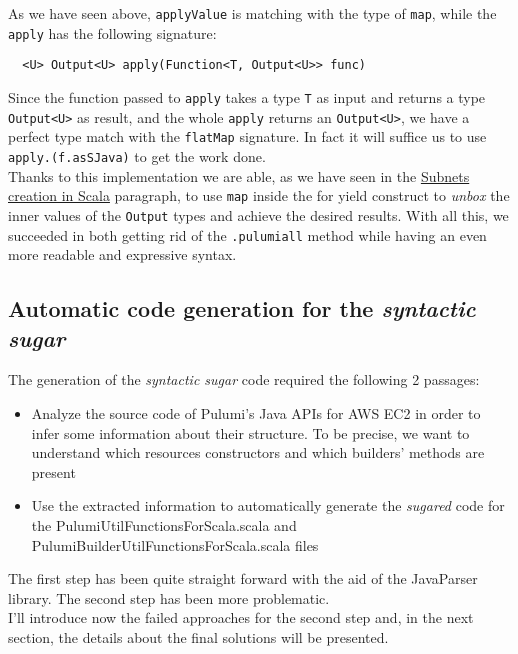 As we have seen above, \texttt{applyValue} is matching with the type of \texttt{map}, while the \texttt{apply} has the following signature:
\begin{verbatim}
  <U> Output<U> apply(Function<T, Output<U>> func)
\end{verbatim}
Since the function passed to \texttt{apply} takes a type \texttt{T} as input and returns a type \texttt{Output<U>} as result, and the whole \texttt{apply} returns an \texttt{Output<U>}, we have a perfect type match with the \texttt{flatMap} signature.
In fact it will suffice us to use \texttt{apply.(f.asSJava)} to get the work done.\\
Thanks to this implementation we are able, as we have seen in the \hyperref[sssec:subnets-creation]{Subnets creation in Scala} paragraph, 
to use \texttt{map} inside the for yield construct to \textit{unbox} the inner values of the \texttt{Output} types and achieve the desired results.
With all this, we succeeded in both getting rid of the \texttt{.pulumiall} method while having an even more readable and expressive syntax.

\subsection{Automatic code generation for the \textit{syntactic sugar}}
The generation of the \textit{syntactic sugar} code required the following 2 passages:
\begin{itemize}
  \item Analyze the source code of Pulumi's Java APIs for AWS EC2 in order to infer some information about their structure. To be precise, we want to understand which resources constructors and which builders' methods are present%
  \item Use the extracted information to automatically generate the \textit{sugared} code for the PulumiUtilFunctionsForScala.scala and PulumiBuilderUtilFunctionsForScala.scala files
\end{itemize}
The first step has been quite straight forward with the aid of the JavaParser library.
The second step has been more problematic.\\
I'll introduce now the failed approaches for the second step and, in the next section, the details about the final solutions will be presented.

